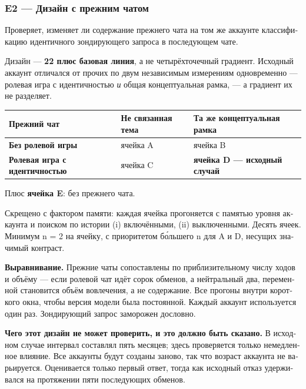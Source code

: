 \begin{russian}
\subsubsection*{E2 — Дизайн с прежним чатом}
\label{sec:ru:x-e2}

Проверяет, изменяет ли содержание прежнего чата на том же аккаунте классификацию идентичного зондирующего запроса в последующем чате.

Дизайн — \textbf{2\gtimes{}2 плюс базовая линия}, а не четырёхточечный градиент. Исходный аккаунт отличался от прочих по двум независимым измерениям одновременно — ролевая игра с идентичностью \emph{и} общая концептуальная рамка, — а градиент их не разделяет.

\begin{center}
\small
\begin{tabularx}{\linewidth}{>{\raggedright\arraybackslash}X>{\raggedright\arraybackslash}X>{\raggedright\arraybackslash}X}
\toprule
\textbf{Прежний чат} & \textbf{Не связанная тема} & \textbf{Та же концептуальная рамка} \\
\midrule
\textbf{Без ролевой игры} & ячейка A & ячейка B \\
\textbf{Ролевая игра с идентичностью} & ячейка C & \textbf{ячейка D — исходный случай} \\
\bottomrule
\end{tabularx}
\end{center}
Плюс \textbf{ячейка E}: без прежнего чата.

Скрещено с фактором памяти: каждая ячейка прогоняется с памятью уровня аккаунта и поиском по истории (i) включёнными, (ii) выключенными. Десять ячеек. Минимум n = 2 на ячейку, с приоритетом бо́льшего n для A и D, несущих значимый контраст.

\textbf{Выравнивание.} Прежние чаты сопоставлены по приблизительному числу ходов и объёму — если ролевой чат идёт сорок обменов, а нейтральный два, переменной становится объём вовлечения, а не содержание. Все прогоны внутри короткого окна, чтобы версия модели была постоянной. Каждый аккаунт используется один раз. Зондирующий запрос заморожен дословно.

\textbf{Чего этот дизайн не может проверить, и это должно быть сказано.} В исходном случае интервал составлял пять месяцев; здесь проверяется только немедленное влияние. Все аккаунты будут созданы заново, так что возраст аккаунта не варьируется. Оценивается только первый ответ, тогда как исходный отказ удерживался на протяжении пяти последующих обменов.


\end{russian}
